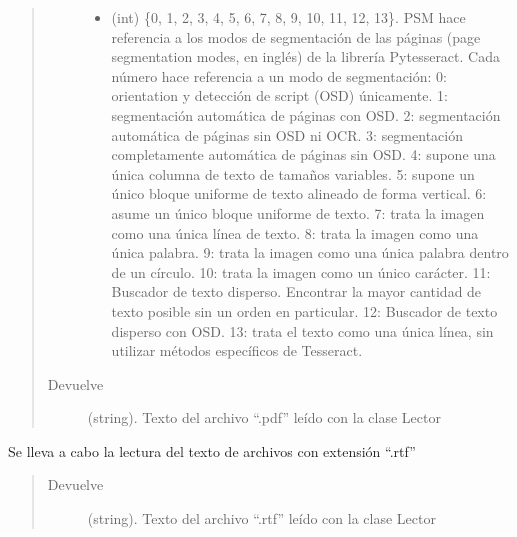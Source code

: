 \documentclass[letterpaper,10pt,openany,spanish]{sphinxmanual}
\begin{document}
\begin{fulllineitems}
\begin{fulllineitems}
\begin{quote}
\begin{description}
\begin{itemize}
\item {} 
 \textendash{} (int) \{0, 1, 2, 3, 4, 5, 6, 7, 8, 9, 10, 11, 12, 13\}. PSM hace referencia a             los modos de segmentación de las páginas (page segmentation modes, en inglés) de la             librería Pytesseract. Cada número hace referencia a un modo de segmentación:               
 0: orientation y detección de script (OSD) únicamente.  
 1: segmentación automática de páginas con OSD.  
 2: segmentación automática de páginas sin OSD ni OCR.  
 3: segmentación completamente automática de páginas sin OSD.  
 4: supone una única columna de texto de tamaños variables.  
 5: supone un único bloque uniforme de texto alineado de forma vertical.  
 6: asume un único bloque uniforme de texto.  
 7: trata la imagen como una única línea de texto.  
 8: trata la imagen como una única palabra.  
 9: trata la imagen como una única palabra dentro de un círculo.  
 10: trata la imagen como un único carácter.  
 11: Buscador de texto disperso. Encontrar la mayor cantidad de texto posible sin un orden en particular.  
 12: Buscador de texto disperso con OSD.  
 13: trata el texto como una única línea, sin utilizar métodos específicos de Tesseract.  


\end{itemize}

\item[{Devuelve}] \leavevmode
(string). Texto del archivo “.pdf” leído con la clase Lector

\end{description}\end{quote}

\end{fulllineitems}


\begin{fulllineitems}
\label{\detokenize{funciones/lectura:lectura.Lector.leer_rtf}}
Se lleva a cabo la lectura del texto de archivos con extensión “.rtf”
\begin{quote}\begin{description}
\item[{Devuelve}] \leavevmode
(string). Texto del archivo “.rtf” leído con la clase Lector

\end{description}\end{quote}


\end{fulllineitems}
\end{fulllineitems}
\end{document}
